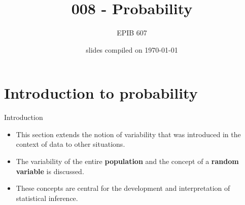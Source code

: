 \documentclass[10pt]{beamer}\usepackage[]{graphicx}\usepackage[]{color}
\begin{document}

\title{008 - Probability}
\author{EPIB 607}

\date{slides compiled on \today}

\maketitle

\section{Introduction to probability}

\begin{frame}{Introduction}
	
	\begin{itemize}
		\item This section extends the notion of variability that was introduced in
		the context of data to other situations. 
		\item The variability of the entire \textbf{population} and the concept of a \textbf{random variable} is discussed. 
		\item These concepts are central for the development and interpretation of
		statistical inference. 
	\end{itemize}
	
\end{frame}
\end{document}
